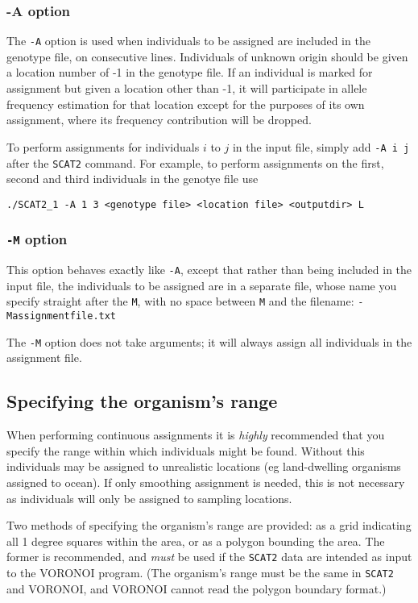 \documentclass[10pt,titlepage,times,letterpaper]{article}
\def\SCAT{{\tt SCAT2} }
\begin{document}
\subsubsection{-A option}

The {\tt -A} option is used when
individuals to be assigned are included in the genotype file, on
consecutive lines. Individuals of unknown origin should be given a
location number of -1 in the genotype file.  If an individual is marked for
assignment but given a location other than -1, it will participate in
allele frequency estimation for that location except for the purposes
of its own assignment, where its frequency contribution will be dropped.

To perform assignments for individuals $i$ to $j$ in the input file,
simply add {\tt -A i j} after the \SCAT command. For example, to
perform assignments on the first, second and third individuals in the
genotye file use

{\tt ./SCAT2\_1 -A 1 3 <genotype file> <location file> <outputdir> L}

\subsubsection{{\tt -M} option} \label{assign2}

This option behaves exactly like {\tt -A}, except that rather than being
included in the input file, the individuals to be assigned are in a
separate file, whose name you specify straight after the {\tt M}, with
no space between {\tt M} and the filename:
 {\tt -Massignmentfile.txt} 

The {\tt -M} option does not take arguments; it will always assign all
individuals in the assignment file.
 
\subsection{Specifying the organism's range} \label{boundary}

When performing continuous assignments it is {\it highly}
recommended that you specify the range within which individuals might
be found. Without this individuals may be assigned to unrealistic
locations (eg land-dwelling organisms assigned to ocean).  If only
smoothing assignment is needed, this is not necessary as individuals will
only be assigned to sampling locations.

Two methods of specifying the organism's range are provided:  as
a grid indicating all 1 degree squares within the area, or as a polygon
bounding the area.  The former is recommended, and {\it must} be
used if the \SCAT data are intended as input to the VORONOI program.  (The
organism's range must be the same in \SCAT and VORONOI, and VORONOI cannot
read the polygon boundary format.) 
\end{document}
